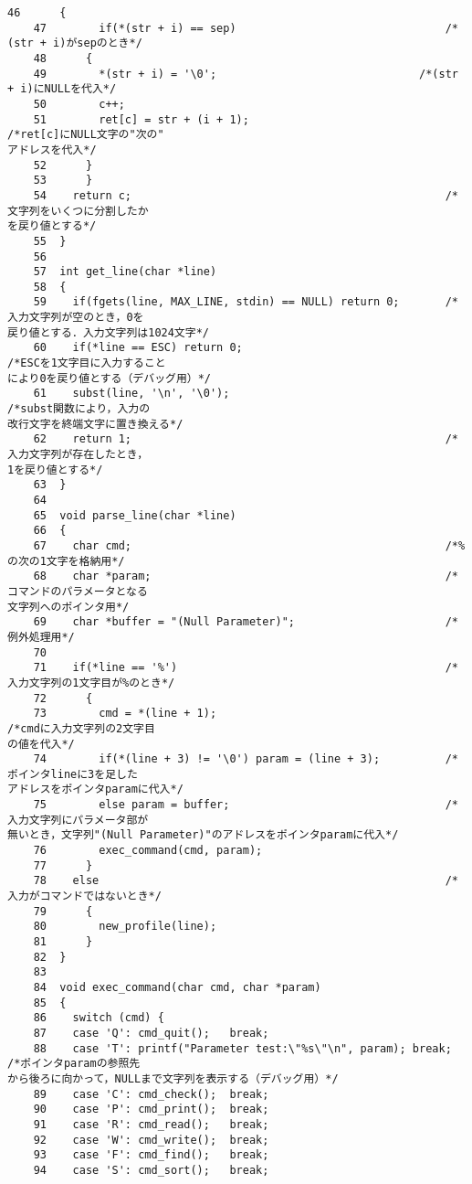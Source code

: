 \begin{Verbatim}[fontsize=\small, baselinestretch=0.8]
    46	    {
    47	      if(*(str + i) == sep)                                /*(str + i)がsepのとき*/
    48		{
    49		  *(str + i) = '\0';                               /*(str + i)にNULLを代入*/
    50		  c++;
    51		  ret[c] = str + (i + 1);                          /*ret[c]にNULL文字の"次の"
アドレスを代入*/
    52		}
    53	    }
    54	  return c;                                                /*文字列をいくつに分割したか
を戻り値とする*/
    55	}
    56	
    57	int get_line(char *line)
    58	{
    59	  if(fgets(line, MAX_LINE, stdin) == NULL) return 0;       /*入力文字列が空のとき，0を
戻り値とする．入力文字列は1024文字*/
    60	  if(*line == ESC) return 0;                               /*ESCを1文字目に入力すること
により0を戻り値とする（デバッグ用）*/
    61	  subst(line, '\n', '\0');                                 /*subst関数により，入力の
改行文字を終端文字に置き換える*/
    62	  return 1;                                                /*入力文字列が存在したとき，
1を戻り値とする*/
    63	}
    64	
    65	void parse_line(char *line)
    66	{
    67	  char cmd;                                                /*%の次の1文字を格納用*/
    68	  char *param;                                             /*コマンドのパラメータとなる
文字列へのポインタ用*/
    69	  char *buffer = "(Null Parameter)";                       /*例外処理用*/
    70	
    71	  if(*line == '%')                                         /*入力文字列の1文字目が%のとき*/
    72	    {
    73	      cmd = *(line + 1);                                   /*cmdに入力文字列の2文字目
の値を代入*/
    74	      if(*(line + 3) != '\0') param = (line + 3);          /*ポインタlineに3を足した
アドレスをポインタparamに代入*/
    75	      else param = buffer;                                 /*入力文字列にパラメータ部が
無いとき，文字列"(Null Parameter)"のアドレスをポインタparamに代入*/
    76	      exec_command(cmd, param);
    77	    }
    78	  else                                                     /*入力がコマンドではないとき*/
    79	    {
    80	      new_profile(line);
    81	    }
    82	}
    83	
    84	void exec_command(char cmd, char *param)
    85	{
    86	  switch (cmd) {
    87	  case 'Q': cmd_quit();   break;
    88	  case 'T': printf("Parameter test:\"%s\"\n", param); break;   /*ポインタparamの参照先
から後ろに向かって，NULLまで文字列を表示する（デバッグ用）*/
    89	  case 'C': cmd_check();  break;
    90	  case 'P': cmd_print();  break;
    91	  case 'R': cmd_read();   break;
    92	  case 'W': cmd_write();  break;
    93	  case 'F': cmd_find();   break;
    94	  case 'S': cmd_sort();   break;

\end{Verbatim}
